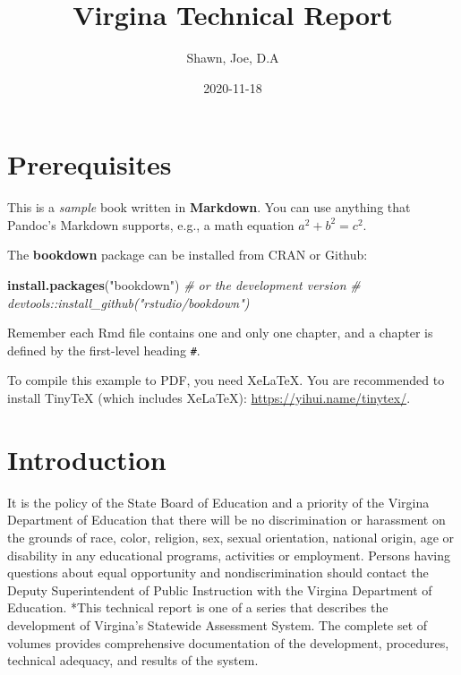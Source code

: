 \documentclass[]{book}
\title{Virgina Technical Report}
\author{Shawn, Joe, D.A}
\date{2020-11-18}
\newenvironment{Shaded}{\begin{snugshade}}{\end{snugshade}}
\newcommand{\CommentTok}[1]{\textcolor[rgb]{0.56,0.35,0.01}{\textit{#1}}}
\newcommand{\KeywordTok}[1]{\textcolor[rgb]{0.13,0.29,0.53}{\textbf{#1}}}
\newcommand{\NormalTok}[1]{#1}
\newcommand{\StringTok}[1]{\textcolor[rgb]{0.31,0.60,0.02}{#1}}
\begin{document}
\maketitle

{
\setcounter{tocdepth}{1}
\tableofcontents
}
\hypertarget{prerequisites}{%
\chapter{Prerequisites}\label{prerequisites}}

This is a \emph{sample} book written in \textbf{Markdown}. You can use anything that Pandoc's Markdown supports, e.g., a math equation \(a^2 + b^2 = c^2\).

The \textbf{bookdown} package can be installed from CRAN or Github:

\begin{Shaded}
\begin{Highlighting}[]
\KeywordTok{install.packages}\NormalTok{(}\StringTok{"bookdown"}\NormalTok{)}
\CommentTok{# or the development version}
\CommentTok{# devtools::install_github("rstudio/bookdown")}
\end{Highlighting}
\end{Shaded}

Remember each Rmd file contains one and only one chapter, and a chapter is defined by the first-level heading \texttt{\#}.

To compile this example to PDF, you need XeLaTeX. You are recommended to install TinyTeX (which includes XeLaTeX): \url{https://yihui.name/tinytex/}.

\hypertarget{intro}{%
\chapter{Introduction}\label{intro}}

It is the policy of the State Board of Education and a priority of the Virgina
Department of Education that there will be no discrimination or harassment on
the grounds of race, color, religion, sex, sexual orientation, national origin,
age or disability in any educational programs, activities or employment. Persons
having questions about equal opportunity and nondiscrimination should contact
the Deputy Superintendent of Public Instruction with the Virgina Department of
Education.
*This technical report is one of a series that describes the development of
Virgina's Statewide Assessment System. The complete set of volumes provides
comprehensive documentation of the development, procedures, technical adequacy,
and results of the system.
\end{document}
